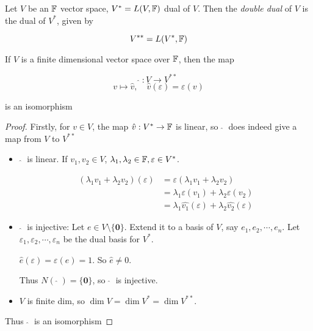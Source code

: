 \documentclass[a4paper]{article}
\begin{document}
\begin{defi}
	Let $ V $ be an $ \mathbb{F} $ vector space, $ V^{*}  = L(V,\mathbb{F}) $ dual of $ V $. Then the \emph{double dual} of $ V $ is the dual of $ V^{*} $, given by
	
	\[ V^{**} = L(V^{*},\mathbb{F}) \] 
\end{defi}

\begin{thm} 
	If $ V $ is a finite dimensional vector space over $ \mathbb{F} $, then the map 
	
	\[ \hat{} \; : V \to V^{**} \]
	\[ v \mapsto \hat{v}, \quad \hat{v}(\varepsilon) = \varepsilon(v) \]
	
	is an isomorphism 
\end{thm}


\begin{proof}
	Firstly, for $ v \in V $, the map $ \hat{v} : V^{*} \to \mathbb{F} $ is linear, so $ \; \hat{} \;  $ does indeed give a map from $ V $ to $ V^{**} $
	
	\begin{itemize}
		\item $ \; \hat{} \; $ is linear. If $ v_{1},v_{2} \in V $, $ \lambda_{1},\lambda_{2} \in \mathbb{F}, \varepsilon \in V^{*} $.
		
		
		
		\begin{align*}
		(\lambda_{1} v_{1} + \lambda_{2} v_{2} ) (\varepsilon) & = \varepsilon(  \lambda_{1}v_{1} + \lambda_{2}v_{2} )\\
		& = \lambda_{1} \varepsilon(v_{1}) + \lambda_{2} \varepsilon(v_{2})\\
		& = \lambda_{1} \hat{v_{1}} (\varepsilon) + \lambda_{2} \hat{v_{2}} (\varepsilon)
		\end{align*}
		
		
		\item $ \; \hat{} \; $ is injective: Let $ e \in V \setminus \{ \mathbf{0} \} $. Extend it to a basis of $ V $, say $ e_{1},e_{2},\cdots,e_{n} $. Let $ \varepsilon_{1},\varepsilon_{2},\cdots,\varepsilon_{n} $ be the dual basis for $ V^{*} $.
		
		$ \hat{e}(\varepsilon) = \varepsilon(e) = 1 $. So $ \hat{e} \neq 0 $.
		
		Thus $ N(\; \hat{} \;) = \{ \mathbf{0} \} $, so $ \; \hat{} \; $ is injective.
		
		\item $ V $ is finite dim, so $ \dim V = \dim V^{*} = \dim V^{**} $. 
		
	\end{itemize}

Thus $ \; \hat{} \; $ is an isomorphism	
	
\end{proof}
\end{document}
